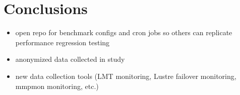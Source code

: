 \section{Conclusions} \label{sec:conclusions}

\begin{itemize}
\item open repo for benchmark configs and cron jobs so others can replicate
performance regression testing
\item anonymized data collected in study
\item new data collection tools (LMT monitoring, Lustre failover monitoring,
mmpmon monitoring, etc.)
\end{itemize}


